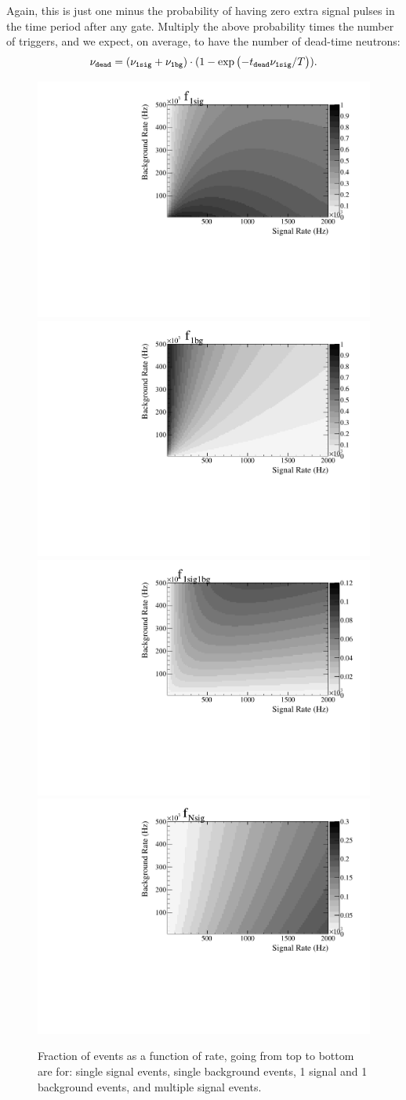 \documentclass[twocolumn]{bmcart}
\begin{document}
\begin{backmatter}
Again, this is just one minus the probability of having zero extra
signal pulses in the time period after any gate.  Multiply the above
probability times the number of triggers, and we expect, on average,
to have the number of dead-time neutrons:
\begin{equation}\label{eq:dead}
\nu_{\tt dead} = (\nu_{\tt 1 sig} + \nu_{\tt 1 bg} ) \cdot 
         ( 1 - \exp{ \left( -t_{\tt dead} \nu_{\tt 1 sig} / T \right) } ).
\end{equation}


\begin{figure}[!htpb]
\centering
\includegraphics[width=.45\textwidth]{figures/tf1sig.pdf}
\includegraphics[width=.45\textwidth]{figures/tf1bg.pdf}
\includegraphics[width=.45\textwidth]{figures/tf1sig1bg.pdf}
\includegraphics[width=.45\textwidth]{figures/tfNsig.pdf}
\caption{ Fraction of events as a function of rate, going from top to
  bottom are for: single signal events, single background events, 1
  signal and 1 background events, and multiple signal events.
}\label{fig:fracs}
\end{figure}




\end{backmatter}
\end{document}
